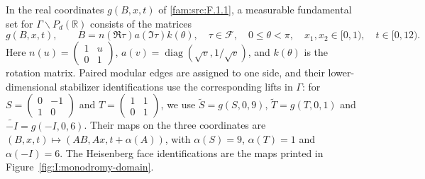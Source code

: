 \begin{proposition}
\label{I:monodromy-fundamental-set}
In the real coordinates $g(B,x,t)$ of
\ref{fam:src:F.1.1}, a measurable fundamental set for
$\Gamma\backslash P_d(\mathbb R)$ consists of the matrices
\[
 g(B,x,t),\qquad
 B=n(\Re\tau)a(\Im\tau)k(\theta),\quad
 \tau\in\mathcal F,\quad 0\le\theta<\pi,
 \quad x_1,x_2\in[0,1),\quad t\in[0,12).
\]
Here
$n(u)=\left(\begin{smallmatrix}1&u\\0&1\end{smallmatrix}\right)$,
$a(v)=\operatorname{diag}(\sqrt v,1/\sqrt v)$,
and $k(\theta)$ is the rotation matrix. Paired modular edges
are assigned to one side, and their lower-dimensional
stabilizer identifications use the corresponding lifts in
$\Gamma$: for
$S=\left(\begin{smallmatrix}0&-1\\1&0\end{smallmatrix}\right)$
and $T=\left(\begin{smallmatrix}1&1\\0&1\end{smallmatrix}\right)$,
we use $\widetilde S=g(S,0,9)$,
$\widetilde T=g(T,0,1)$ and
$\widetilde{-I}=g(-I,0,6)$.
Their maps on the three coordinates are
$(B,x,t)\mapsto(AB,Ax,t+\alpha(A))$, with
$\alpha(S)=9$, $\alpha(T)=1$ and $\alpha(-I)=6$.
The Heisenberg face identifications are the
maps printed in Figure~\ref{fig:I:monodromy-domain}.
\end{proposition}
